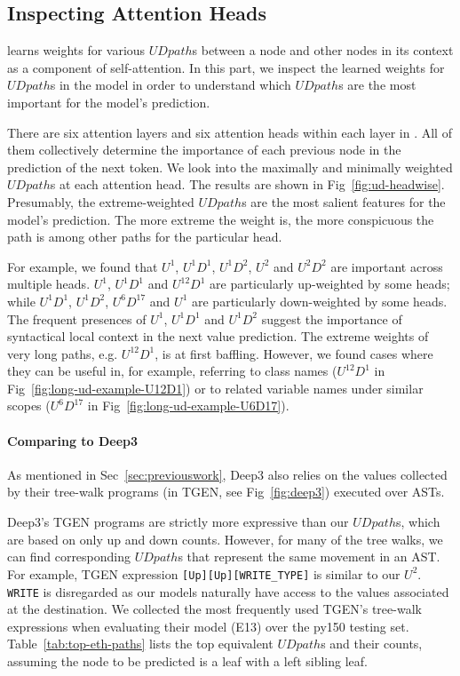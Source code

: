 \documentclass[nonacm, sigconf]{acmart}
\newcommand{\code}[1]{{\texttt{#1}}}
\newcommand{\figref}[1]{Fig~\ref{#1}}
\newcommand{\tabref}[1]{Table~\ref{#1}}
\begin{document}
\subsection{Inspecting Attention Heads}
\label{sec:inspect-attn-heads}
\TreeRel learns weights for various $\mathit{UDpath}$s between a node and other nodes in its context as a component of self-attention.
In this part, we inspect the learned weights for $\mathit{UDpath}$s in the \TreeRel model in order to understand which $\mathit{UDpath}$s are the most important for the model's prediction.

There are six attention layers and six attention heads within each layer in \TreeRel.
All of them collectively determine the importance of each previous node in the prediction of the next token. We look into the maximally and minimally weighted $\mathit{UDpath}$s at each attention head. The results are shown in \figref{fig:ud-headwise}.
Presumably, the extreme-weighted $\mathit{UDpath}$s are the most salient features for the model's prediction.
The more extreme the weight is, the more conspicuous the path is among other paths for the particular head.

For example, we found that $U^1$, $U^1 D^1$, $U^1 D^2$, $U^2$ and $U^2 D^2$ are important across multiple heads.
$U^1$, $U^1 D^1$ and $U^{12} D^1$ are particularly up-weighted by some heads;
while $U^1 D^1$, $U^1 D^2$, $U^6 D^{17}$ and $U^1$ are particularly down-weighted by some heads.
The frequent presences of $U^1$, $U^1 D^1$ and $U^1 D^2$ suggest the importance of syntactical local context in the next value prediction. 
The extreme weights of very long paths, e.g. $U^{12} D^1$, is at first baffling.
However, we found cases where they can be useful in, for example, referring 
to class names ($U^{12} D^1$ in \figref{fig:long-ud-example-U12D1}) or to related variable names under similar scopes ($U^6 D^{17}$ in \figref{fig:long-ud-example-U6D17}).

\paragraph{Comparing to Deep3}
As mentioned in Sec~\ref{sec:previouswork}, Deep3 also relies on the values collected by their tree-walk programs (in TGEN, see Fig~\ref{fig:deep3}) executed over ASTs.



Deep3's TGEN programs are strictly more expressive than our $\mathit{UDpath}$s, which are based on only up and down counts.
However, for many of the tree walks, we can find corresponding $\mathit{UDpath}$s that represent the same movement in an AST. 
For example, TGEN expression \code{[Up][Up][WRITE\_TYPE]} is similar to our $U^2$.
\code{WRITE} is disregarded as our models naturally have access to the values associated at the destination.
We collected the most frequently used TGEN's tree-walk expressions when evaluating their model (E13) over the py150 testing set.
\tabref{tab:top-eth-paths} lists the top equivalent $\mathit{UDpath}$s and their counts, assuming the node to be predicted is a leaf with a left sibling leaf.
\end{document}
